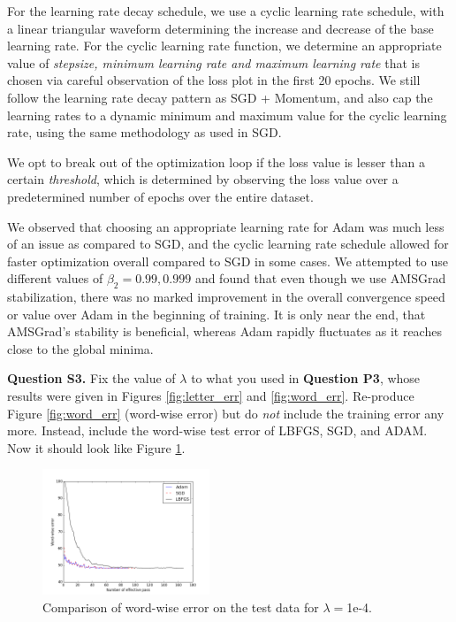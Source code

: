 \documentclass[11pt]{report}
\begin{document}
For the learning rate decay schedule, we use a cyclic learning rate schedule, with a linear triangular waveform determining the increase and decrease of the base learning rate. For the cyclic learning rate function, we determine an appropriate value of \textit{stepsize, minimum learning rate and maximum learning rate} that is chosen via careful observation of the loss plot in the first 20 epochs. We still follow the learning rate decay pattern as SGD + Momentum, and also cap the learning rates to a dynamic minimum and maximum value for the cyclic learning rate, using the same methodology as used in SGD.

We opt to break out of the optimization loop if the loss value is lesser than a certain \textit{threshold}, which is determined by observing the loss value over a predetermined number of epochs over the entire dataset.

We observed that choosing an appropriate learning rate for Adam was much less of an issue as compared to SGD, and the cyclic learning rate schedule allowed for faster optimization overall compared to SGD in some cases. We attempted to use different values of $\beta_2 = {0.99, 0.999}$ and found that even though we use AMSGrad stabilization, there was no marked improvement in the overall convergence speed or value over Adam in the beginning of training. It is only near the end, that AMSGrad's stability is beneficial, whereas Adam rapidly fluctuates as it reaches close to the global minima.

{\bf Question S3.}
Fix the value of $\lambda$ to what you used in {\bf Question P3},
whose results were given in Figures \ref{fig:letter_err} and \ref{fig:word_err}.
Re-produce Figure \ref{fig:word_err} (word-wise error) but do \emph{not} include the training error any more.
Instead, include the word-wise test error of LBFGS, SGD, and ADAM.
Now it should look like Figure \ref{fig:compare_word_err}.

\begin{figure}[t]
\centering
\includegraphics[width=5cm]{s3}
\caption{Comparison of word-wise error on the test data for $\lambda=$1e-4.}
\label{fig:compare_word_err}
\end{figure}
\end{document}
